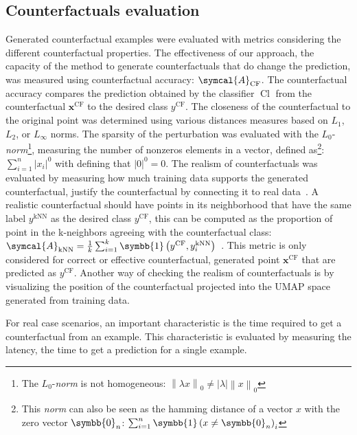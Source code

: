 \documentclass[../main.tex]{subfiles}
\begin{document}
	\subsection{Counterfactuals evaluation}
		Generated counterfactual examples were evaluated with metrics considering the different counterfactual properties.
		The effectiveness of our approach, \ie{}the capacity of the method to generate counterfactuals that do change the prediction, was measured using counterfactual accuracy: \(\symcal{A}_{\text{CF}}\).
		The counterfactual accuracy compares the prediction obtained by the classifier \(\operatorname{Cl}\) from the counterfactual \(\symbf{x}^{\text{CF}}\) to the desired class \(y^{\text{CF}}\).
		The closeness of the counterfactual to the original point was determined using various distances measures based on \(L_{1}\), \(L_{2}\), or \(L_{\infty}\) norms.
		The sparsity of the perturbation was evaluated with the \(L_{0}\)-\emph{norm}\footnote{The \(L_{0}\)-\emph{norm} is not homogeneous: \(\left\|\lambda x \right\|_{0} \neq \left|\lambda\right| \left\| x \right\|_{0}\)}, measuring the number of nonzeros elements in a vector, defined as\footnote{This \emph{norm} can also be seen as the hamming distance of a vector \(x\) with the zero vector \(\symbb{0}_{n}\): \(\sum_{i=1}^{n} \symbb{1}\left(x \neq \symbb{0}_{n}\right)_{i}\)}: \(\sum_{i=1}^{n} \left|x_{i}\right|^{0}\) with defining that \(\left|0\right|^{0}=0\).
		The realism of counterfactuals was evaluated by measuring how much training data supports the generated counterfactual, \ie{} justify the counterfactual by connecting it to real data~\cite{JustifyCF}.
		A realistic counterfactual should have points in its neighborhood that have the same label \( y^{\text{kNN}}\) as the desired class \(y^{\text{CF}}\), this can be computed as the proportion of point in the k-neighbors agreeing with the counterfactual class: \(\symcal{A}_{\text{kNN}} = \frac{1}{k}\sum_{i=1}^{k}\symbb{1}\left(y^{\text{CF}},  y^{\text{kNN}}_{i}\right)\)~\cite{Carla_CF}.
		This metric is only considered for correct or effective counterfactual, generated point \(\symbf{x}^{\text{CF}}\) that are predicted as \(y^{\text{CF}}\).
		Another way of checking the realism of counterfactuals is by visualizing the position of the counterfactual projected into the UMAP space generated from training data.

		For real case scenarios, an important characteristic is the time required to get a counterfactual from an example.
		This characteristic is evaluated by measuring the latency, the time to get a prediction for a single example.
\end{document}
